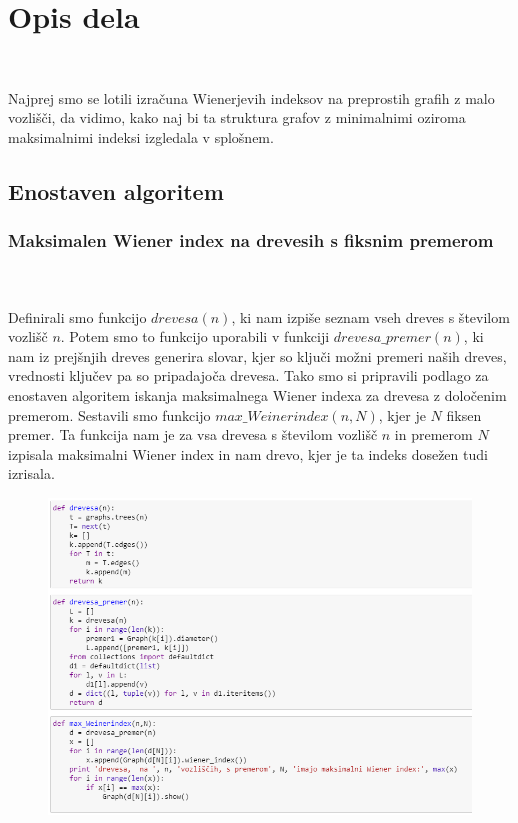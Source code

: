 \documentclass[12pt,a4paper]{amsart}
\theoremstyle{definition} %
\theoremstyle{plain} %
\begin{document}
\section{Opis dela}

\

Najprej smo se lotili izračuna Wienerjevih indeksov na preprostih grafih z malo vozlišči, da vidimo, kako naj bi ta struktura grafov 
z minimalnimi oziroma maksimalnimi indeksi izgledala v splošnem. 
\subsection{Enostaven algoritem}
\subsubsection{Maksimalen Wiener index na drevesih s fiksnim premerom}
\
\\
\\
Definirali smo funkcijo $drevesa(n)$, ki nam izpiše seznam vseh dreves s številom vozlišč $n$. Potem smo to funkcijo uporabili v 
funkciji $drevesa\_premer(n)$, ki nam iz prejšnjih dreves generira slovar, kjer so ključi možni premeri naših dreves, vrednosti ključev pa so pripadajoča drevesa. Tako smo si pripravili podlago za enostaven algoritem iskanja maksimalnega Wiener indexa za drevesa z določenim premerom. 
Sestavili smo funkcijo $max\_Weinerindex(n,N)$, kjer je $N$ fiksen premer. Ta funkcija nam je za vsa drevesa s številom vozlišč $n$ in premerom $N$ izpisala maksimalni Wiener index in nam drevo, kjer je ta indeks dosežen tudi izrisala.
\begin{figure}[ht]
\centering
\includegraphics[width=1\textwidth]{slika1}
\end{figure}
\pagebreak
\end{document}
